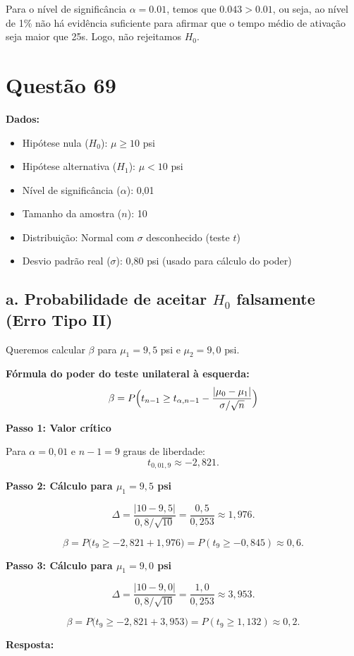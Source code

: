 \documentclass[12pt]{article}
\newcommand{\quest}[1]{\section*{Questão #1}} %
\begin{document}
Para o nível de significância $\alpha = 0.01$, temos que $0.043 > 0.01$, ou seja, ao nível de 1\% não há evidência suficiente para afirmar que o tempo médio de ativação seja maior que 25s. Logo, não rejeitamos $H_0$.

\quest{69}

\textbf{Dados:}
\begin{itemize}
    \item Hipótese nula (\(H_0\)): \(\mu \geq 10\) psi
    \item Hipótese alternativa (\(H_1\)): \(\mu < 10\) psi
    \item Nível de significância (\(\alpha\)): 0,01
    \item Tamanho da amostra (\(n\)): 10
    \item Distribuição: Normal com \(\sigma\) desconhecido (teste \(t\))
    \item Desvio padrão real (\(\sigma\)): 0,80 psi (usado para cálculo do poder)
\end{itemize}

\subsection*{a. Probabilidade de aceitar \(H_0\) falsamente (Erro Tipo II)}

Queremos calcular \(\beta\) para \(\mu_1 = 9,5\) psi e \(\mu_2 = 9,0\) psi.

\textbf{Fórmula do poder do teste unilateral à esquerda:}
\[
\beta = P\Bigl( t_{n-1} \geq t_{\alpha, n-1} - \frac{|\mu_0 - \mu_1|}{\sigma/\sqrt{n}} \Bigr)
\]

\textbf{Passo 1: Valor crítico}

Para \(\alpha=0{,}01\) e \(n-1=9\) graus de liberdade:
\[
t_{0,01,9} \approx -2,821.
\]

\textbf{Passo 2: Cálculo para \(\mu_1=9,5\) psi}

\[
\Delta = \frac{|10 - 9,5|}{0,8/\sqrt{10}} 
= \frac{0,5}{0,253} \approx 1,976.
\]

\[
\beta = P\bigl(t_{9} \geq -2,821 + 1,976\bigr)
= P(t_{9} \geq -0,845) \approx 0,6.
\]

\textbf{Passo 3: Cálculo para \(\mu_1=9,0\) psi}

\[
\Delta = \frac{|10 - 9,0|}{0,8/\sqrt{10}}
= \frac{1,0}{0,253} \approx 3,953.
\]

\[
\beta = P\bigl(t_{9} \geq -2,821 + 3,953\bigr)
= P(t_{9} \geq 1,132) \approx 0,2.
\]

\textbf{Resposta:}
\end{document}
